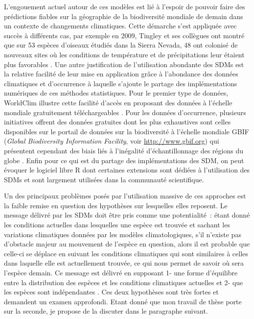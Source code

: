 L'engouement actuel autour de ces modèles est lié à l'espoir de pouvoir
faire des prédictions fiables sur la géographie de la biodiversité
mondiale de demain dans un contexte de changements climatiques. Cette
démarche s'est appliquée avec succès à différents cas, par exemple en
2009, Tingley et ses collègues ont montré que sur 53 espèces d'oiseaux
étudiés dans la Sierra Nevada, 48 ont colonisé de nouveaux sites où les
conditions de température et de précipitations leur étaient plus
favorables \citep{Tingley2009}. Une autre justification de l'utilisation
abondante des SDMs est la relative facilité de leur mise en application
grâce à l'abondance des données climatiques et d'occurrence à laquelle
s'ajoute le partage des implémentations numériques de ces méthodes
statistiques. Pour le premier type de données, WorldClim illustre cette
facilité d'accès en proposant des données à l'échelle mondiale
gratuitement téléchargeables \citep[voir
\url{http://worldclim.org}][]{Hijmans2005}. Pour les données
d'occurrence, plusieurs initiatives offrent des données gratuites dont
les plus exhaustives sont celles disponibles sur le portail de données
sur la biodiversité à l'échelle mondiale GBIF (\emph{Global Biodiversity
Information Facility}, voir \url{http://www.gbif.org}) qui présentent
cependant des biais liés à l'inégalité d'échantillonnage des régions du
globe \citep{Beck2014a}. Enfin pour ce qui est du partage des
implémentations des SDM, on peut évoquer le logiciel libre R
\citep{Rcoreteam2015} dont certaines extensions sont dédiées à
l'utilisation des SDMs et sont largement utilisées dans la communauté
scientifique.

Un des principaux problèmes posés par l'utilisation massive de ces
approches est la faible remise en question des hypothèses sur lesquelles
elles reposent. Le message délivré par les SDMs doit être pris comme une
potentialité~: étant donné les conditions actuelles dans lesquelles une
espèce est trouvée et sachant les variations climatiques données par les
modèles climatologiques, s'il n'existe pas d'obstacle majeur au
mouvement de l'espèce en question, alors il est probable que celle-ci se
déplace en suivant les conditions climatiques qui sont similaires à
celles dans laquelle elle est actuellement trouvée, ce qui nous permet
de savoir où sera l'espèce demain. Ce message est délivré en supposant
1- une forme d'équilibre entre la distribution des espèces et les
conditions climatiques actuelles et 2- que les espèces sont
indépendantes \citep{Jeschke2008}. Ces deux hypothèses sont très fortes
et demandent un examen approfondi. Etant donné que mon travail de thèse
porte sur la seconde, je propose de la discuter dans le paragraphe
suivant.

